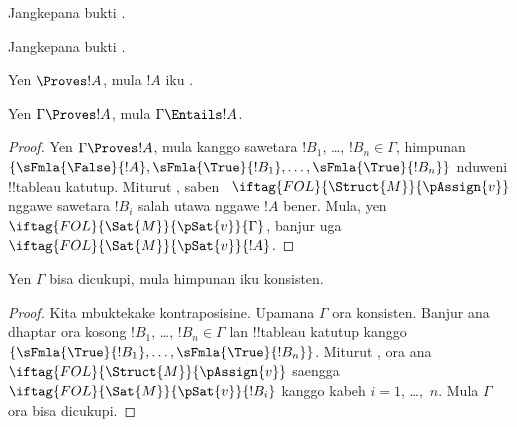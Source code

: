 \documentclass[../../../include/open-logic-section]{subfiles}
\begin{document}
\begin{prob}
Jangkepana bukti .
\end{prob}
\tagendprob

\begin{prob}
Jangkepana bukti .
\end{prob}
\tagendprob

\begin{cor}
Yen $\Proves !A$, mula $!A$ iku .
\end{cor}

\begin{cor}
Yen $\Gamma \Proves !A$, mula $\Gamma \Entails !A$.
\end{cor}

\begin{proof}
  Yen $\Gamma \Proves !A$, mula kanggo sawetara $!B_1$, \dots,
  $!B_n \in \Gamma$, himpunan $\{\sFmla{\False}{!A},
  \sFmla{\True}{!B_1}, \dots, \sFmla{\True}{!B_n}\}$ nduweni
  !!{tableau} katutup. Miturut
  , saben
  ~$\iftag{FOL}{\Struct{M}}{\pAssign{v}}$
  nggawe sawetara $!B_i$ salah utawa nggawe $!A$ bener. Mula, yen
  $\iftag{FOL}{\Sat{M}}{\pSat{v}}{\Gamma}$, banjur uga
  $\iftag{FOL}{\Sat{M}}{\pSat{v}}{!A}$.
\end{proof}

\begin{cor}
Yen $\Gamma$ bisa dicukupi, mula himpunan iku konsisten.
\end{cor}

\begin{proof}
Kita mbuktekake kontraposisine. Upamana $\Gamma$ ora konsisten. Banjur
ana dhaptar ora kosong $!B_1$, \dots, $!B_n \in \Gamma$ lan !!{tableau} katutup kanggo
$\{\sFmla{\True}{!B_1}, \dots, \sFmla{\True}{!B_n}\}$. Miturut
, ora ana
$\iftag{FOL}{\Struct{M}}{\pAssign{v}}$ saengga
$\iftag{FOL}{\Sat{M}}{\pSat{v}}{!B_i}$ kanggo kabeh $i=1$, \dots,~$n$.
Mula $\Gamma$ ora bisa dicukupi.
\end{proof}
\end{document}
